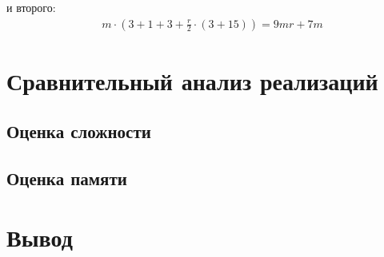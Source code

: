 и второго:
\begin{equation}
    \begin{split}
    & m \cdot{} (3 + 1 + 3 + \frac{r}{2} \cdot{} (3 + 15)) = 9mr + 7m
    \end{split}
\end{equation}


\section{Сравнительный анализ реализаций}

\subsection{Оценка сложности}

\subsection{Оценка памяти}

\section{Вывод}

